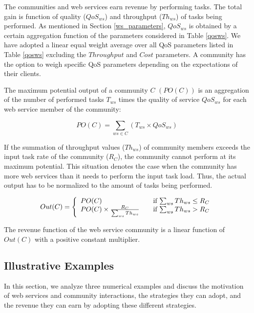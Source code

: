 \documentclass[10pt,journal,cspaper,compsoc]{IEEEtran}
\begin{document}
The communities and web services earn revenue by performing tasks.
The total gain is function of quality ($QoS_{ws}$) and throughput
($Th_{ws}$) of tasks being performed. As mentioned in Section
\ref{ws_parameters}, $QoS_{ws}$ is obtained by a certain
aggregation function of the parameters considered in Table
\ref{qosws}. We have adopted a linear equal weight average over
all QoS parameters listed in Table \ref{qosws} excluding the
$Throughput$ and $Cost$ parameters. A community has the option to
weigh specific QoS parameters depending on the expectations of
their clients.

The maximum potential output of a community $C$ $(PO(C))$  is an
aggregation of the number of performed tasks $T_{ws}$ times the
quality of service $QoS_{ws}$ for each web service member of the
community:

\begin{equation}
PO(C) = \sum_{ws \in C}{(T_{ws} \times QoS_{ws})}
\end{equation}

If the summation of throughput values ($Th_{ws}$) of community
members exceeds the input task rate of the community ($R_C$), the
community cannot perform at its maximum potential. This situation
denotes the case when the community has more web services than it
needs to perform the input task load. Thus, the actual output has
to be normalized to the amount of tasks being performed.

\begin{equation}\label{out_c}
Out(C) = \left\{
  \begin{array}{l l}
    PO(C) & \quad \text{if $\sum_{ws}{Th_{ws}} \leq R_{C}$}\\
    PO(C) \times \frac{R_{C}}{\sum_{ws}{Th_{ws}}} & \quad \text{if $\sum_{ws}{Th_{ws}} > R_{C}$}
  \end{array} \right.
\end{equation}

The revenue function of the web service community is a linear
function of $Out(C)$ with a positive constant multiplier.

\subsection{Illustrative Examples}

In this section, we analyze three numerical examples and discuss
the motivation of web services and community interactions, the
strategies they can adopt, and the revenue they can earn by
adopting these different strategies.
\end{document}

